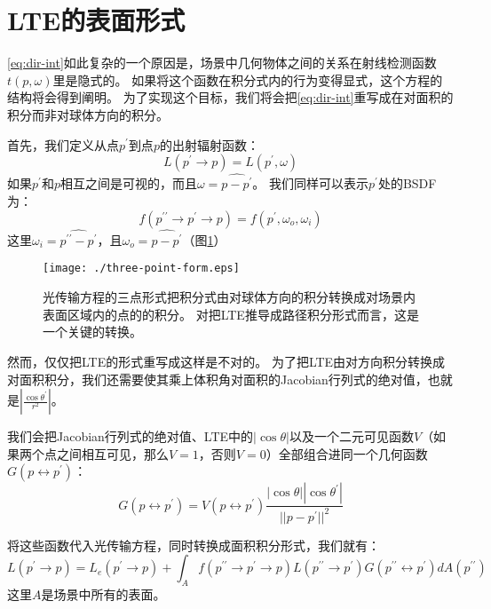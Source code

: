 \documentclass[a4paper]{article}
\begin{document}
	\section{LTE的表面形式}	
	\eqref{eq:dir-int}如此复杂的一个原因是，场景中几何物体之间的关系在射线检测函数$t(p,\omega)$里是隐式的。
	如果将这个函数在积分式内的行为变得显式，这个方程的结构将会得到阐明。
	为了实现这个目标，我们将会把\eqref{eq:dir-int}重写成在对面积的积分而非对球体方向的积分。

	首先，我们定义从点$p^\prime$到点$p$的出射辐射函数：
	\begin{equation*}
		L(p^\prime\rightarrow p)=L(p^\prime,\omega)
	\end{equation*}
	如果$p^\prime$和$p$相互之间是可视的，而且$\omega=\widehat{p - p^\prime}$。
	我们同样可以表示$p^\prime$处的BSDF为：
	\begin{equation*}
		f(p^{\prime\prime}\rightarrow p^\prime\rightarrow p)=f(p^\prime,\omega_o,\omega_i)
	\end{equation*}
	这里$\omega_i=\widehat{p^{\prime\prime}-p^\prime}$，且$\omega_o=\widehat{p-p^\prime}$（图\ref{fig:three-point-form}）
	\begin{figure}[h!]
		\begin{framed}
		\texttt{[image: ./three-point-form.eps]}
		\caption{光传输方程的三点形式把积分式由对球体方向的积分转换成对场景内表面区域内的点的的积分。
		对把LTE推导成路径积分形式而言，这是一个关键的转换。}
		\label{fig:three-point-form}
		\end{framed}
	\end{figure}

	然而，仅仅把LTE的形式重写成这样是不对的。
	为了把LTE由对方向积分转换成对面积积分，我们还需要使其乘上体积角对面积的Jacobian行列式的绝对值，也就是$|\frac{\cos\theta^\prime}{r^2}|$。

	我们会把Jacobian行列式的绝对值、LTE中的$|\cos\theta|$以及一个二元可见函数$V$（如果两个点之间相互可见，那么$V=1$，否则$V=0$）全部组合进同一个几何函数$G(p\leftrightarrow p^\prime)$：
	\begin{equation*}
		G(p\leftrightarrow p^{\prime})=V(p\leftrightarrow p^{\prime})\frac{|\cos\theta||\cos\theta^{\prime}|}{||p-p^{\prime}||^2}
		\label{eq:b}
	\end{equation*}

	将这些函数代入光传输方程，同时转换成面积积分形式，我们就有：
	\begin{equation}
		L(p^\prime \rightarrow p)=L_e(p^\prime\rightarrow p)+\int_A f(p^{\prime\prime} \rightarrow p^\prime \rightarrow p)L(p^{\prime\prime}\rightarrow p^{\prime})G(p^{\prime\prime}\leftrightarrow p^\prime)dA(p^{\prime\prime})
		\label{eq:area-int}
	\end{equation}
	这里$A$是场景中所有的表面。
	
\end{document}
